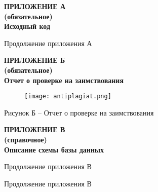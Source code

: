 \newpage
\begin{center}
  \textbf{
  \MakeUppercase{Приложение А}\\
  (обязательное)\\
  \vspace{1em}
  Исходный код}
  \end{center}
  
  
  
  \begin{center}
    Продолжение приложения А
    \end{center}
  
  
  \newpage

  \begin{center}
    \textbf{
      \MakeUppercase{Приложение Б}\\
      (обязательное)\\
      \vspace{1em}
      Отчет о проверке на заимствования}
    \end{center}
    \begin{figure}[h]
      \centering
      \texttt{[image: antiplagiat.png]} 
    \end{figure}
    \vspace{-5mm}
      \centerline{Рисунок Б -- Отчет о проверке на заимствования}
    
    \newpage
  
  \begin{center}
  \textbf{
  \MakeUppercase{Приложение В}\\ 
  (справочное)\\
  \vspace{1em}
  Описание схемы базы данных}
  \end{center}
  
  
  \begin{center}
    Продолжение приложения В
    \end{center}
  
  \begin{center}
    Продолжение приложения В
    \end{center}
  

